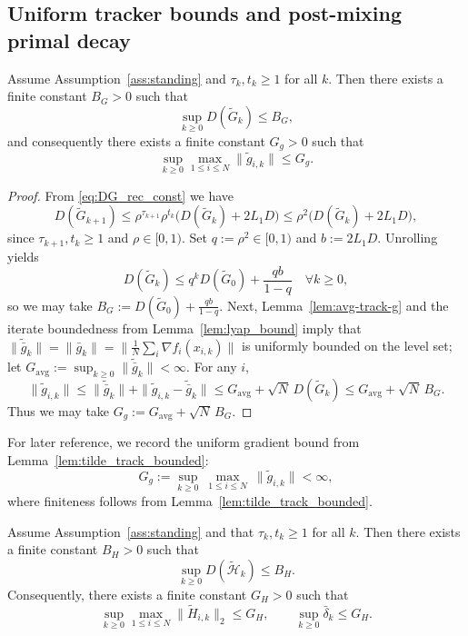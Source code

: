 \documentclass[review,onefignum,onetabnum]{siamart171218}
\begin{document}
\subsection{Uniform tracker bounds and post-mixing primal decay}

\begin{lemma}\label{lem:tilde_track_bounded}
Assume Assumption~\ref{ass:standing} and $\tau_k,t_k\ge 1$ for all $k$.
Then there exists a finite constant $B_G>0$ such that
\[
\sup_{k\ge 0} D(\tilde G_k)\le B_G,
\]
and consequently there exists a finite constant $G_g>0$ such that
\[
\sup_{k\ge 0}\max_{1\le i\le N}\|\tilde g_{i,k}\|\le G_g.
\]
\end{lemma}
\begin{proof}
From \eqref{eq:DG_rec_const} we have
\[
D(\tilde G_{k+1})\le \rho^{\tau_{k+1}}\rho^{t_k}\big(D(\tilde G_k)+2L_1D\big)\le \rho^2\big(D(\tilde G_k)+2L_1D\big),
\]
since $\tau_{k+1},t_k\ge 1$ and $\rho\in[0,1)$.
Set $q:=\rho^2\in[0,1)$ and $b:=2L_1D$. Unrolling yields
\[
D(\tilde G_k)\le q^k D(\tilde G_0)+\frac{qb}{1-q}\quad\forall k\ge 0,
\]
so we may take $B_G:=D(\tilde G_0)+\frac{qb}{1-q}$.
Next, Lemma~\ref{lem:avg-track-g} and the iterate boundedness from Lemma~\ref{lem:lyap_bound} imply that
$\|\tilde{\bar g}_k\|=\|\bar g_k\|=\big\|\frac1N\sum_i \nabla f_i(x_{i,k})\big\|$ is uniformly bounded on the level set;
let $G_{\mathrm{avg}}:=\sup_{k\ge 0}\|\tilde{\bar g}_k\|<\infty$.
For any $i$,
\[
\|\tilde g_{i,k}\|\le \|\tilde{\bar g}_k\|+\|\tilde g_{i,k}-\tilde{\bar g}_k\|
\le G_{\mathrm{avg}}+\sqrt N\,D(\tilde G_k)\le G_{\mathrm{avg}}+\sqrt N\,B_G.
\]
Thus we may take $G_g:=G_{\mathrm{avg}}+\sqrt N\,B_G$.
\end{proof}

For later reference, we record the uniform gradient bound from Lemma~\ref{lem:tilde_track_bounded}:
\begin{equation}\label{eq:step_unif_app}
G_g:=\sup_{k\ge 0}\ \max_{1\le i\le N}\ \|\tilde g_{i,k}\| < \infty,
\end{equation}
where finiteness follows from Lemma~\ref{lem:tilde_track_bounded}.

\begin{lemma}\label{lem:tilde_hess_bounded}
Assume Assumption~\ref{ass:standing} and that $\tau_k,t_k\ge 1$ for all $k$.
Then there exists a finite constant $B_H>0$ such that
\[
\sup_{k\ge 0} D(\tilde{\mathcal H}_k)\le B_H.
\]
Consequently, there exists a finite constant $G_H>0$ such that
\[
\sup_{k\ge 0}\max_{1\le i\le N}\big\|\tilde H_{i,k}\big\|_2 \le G_H,
\qquad
\sup_{k\ge 0}\bar\delta_k \le G_H.
\]
\end{lemma}
\end{document}
